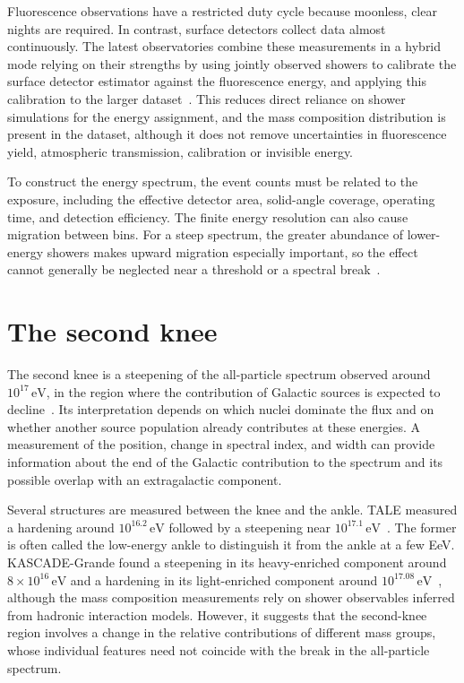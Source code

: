 \documentclass[main.tex]{subfiles}
\begin{document}
Fluorescence observations have a restricted duty cycle because moonless, clear nights are required.
In contrast, surface detectors collect data almost continuously.
The latest observatories combine these measurements in a hybrid mode relying on their strengths by using jointly observed showers to calibrate the surface detector estimator against the fluorescence energy, and applying this calibration to the larger dataset~\cite{PierreAuger:2015:Observatory}.
This reduces direct reliance on shower simulations for the energy assignment, and the mass composition distribution is present in the dataset, although it does not remove uncertainties in fluorescence yield, atmospheric transmission, calibration or invisible energy.

To construct the energy spectrum, the event counts must be related to the exposure, including the effective detector area, solid-angle coverage, operating time, and detection efficiency.
The finite energy resolution can also cause migration between bins.
For a steep spectrum, the greater abundance of lower-energy showers makes upward migration especially important, so the effect cannot generally be neglected near a threshold or a spectral break~\cite{PierreAuger:2020:Spectrum}.

\section{The second knee}
\label{sec:cr_transition}

The second knee is a steepening of the all-particle spectrum observed around $10^{17}\,\mathrm{eV}$, in the region where the contribution of Galactic sources is expected to decline~\cite{Aloisio:2012:Transition}.
Its interpretation depends on which nuclei dominate the flux and on whether another source population already contributes at these energies.
A measurement of the position, change in spectral index, and width can provide information about the end of the Galactic contribution to the spectrum and its possible overlap with an extragalactic component.

Several structures are measured between the knee and the ankle.
TALE measured a hardening around $10^{16.2}\,\mathrm{eV}$ followed by a steepening near $10^{17.1}\,\mathrm{eV}$~\cite{TALE:2018:SecondKnee}.
The former is often called the low-energy ankle to distinguish it from the ankle at a few EeV.
KASCADE-Grande found a steepening in its heavy-enriched component around $8\times10^{16}\,\mathrm{eV}$ and a hardening in its light-enriched component around $10^{17.08}\,\mathrm{eV}$~\cite{KASKADE:2011Kneelike,KASCADEGrande:2013:LightAnkle}, although the mass composition measurements rely on shower observables inferred from hadronic interaction models.
However, it suggests that the second-knee region involves a change in the relative contributions of different mass groups, whose individual features need not coincide with the break in the all-particle spectrum.
\end{document}
